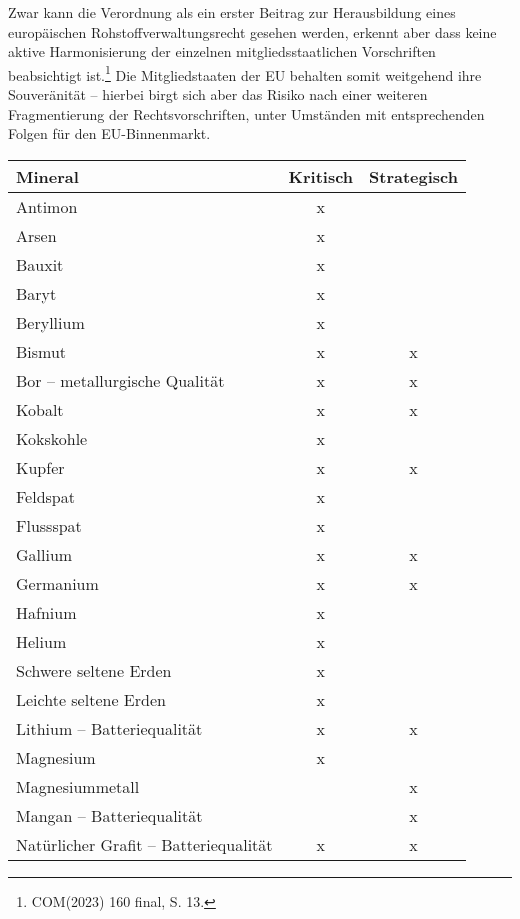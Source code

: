 \documentclass[12pt,a4paper,oneside]{book} %
\begin{document}
	Zwar kann die Verordnung als ein erster Beitrag zur Herausbildung eines europäischen Rohstoffverwaltungsrecht gesehen werden, erkennt aber dass keine aktive Harmonisierung der einzelnen mitgliedsstaatlichen Vorschriften beabsichtigt ist.\footnote{COM(2023) 160 final, S. 13.} Die Mitgliedstaaten der EU behalten somit weitgehend ihre Souveränität -- hierbei birgt sich aber das Risiko nach einer weiteren Fragmentierung der Rechtsvorschriften, unter Umständen mit entsprechenden Folgen für den EU-Binnenmarkt.
	
	
	\begin{tabular}{|>{\raggedright}p{5cm}|c|c|}
		\hline
		\textbf{Mineral} & \textbf{Kritisch} & \textbf{Strategisch} \\
		\hline
		Antimon & x & \\
		\hline
		Arsen & x & \\
		\hline
		Bauxit & x & \\
		\hline
		Baryt & x & \\
		\hline
		Beryllium & x & \\
		\hline
		Bismut & x & x \\
		\hline
		Bor – metallurgische Qualität & x & x \\
		\hline
		Kobalt & x & x \\
		\hline
		Kokskohle & x & \\
		\hline
		Kupfer & x & x \\
		\hline
		Feldspat & x & \\
		\hline
		Flussspat & x & \\
		\hline
		Gallium & x & x \\
		\hline
		Germanium & x & x \\
		\hline
		Hafnium & x & \\
		\hline
		Helium & x & \\
		\hline
		Schwere seltene Erden & x & \\
		\hline
		Leichte seltene Erden & x & \\
		\hline
		Lithium – Batteriequalität & x & x \\
		\hline
		Magnesium & x & \\
		\hline
		Magnesiummetall & & x \\
		\hline
		Mangan – Batteriequalität & & x \\
		\hline
		Natürlicher Grafit – Batteriequalität & x & x \\
		\hline

\end{tabular}
\end{document}
